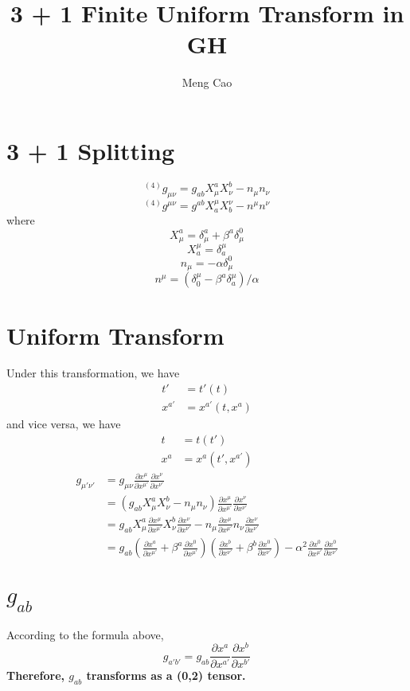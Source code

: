 \documentclass{article}
\begin{document}
\title{3 + 1 Finite Uniform Transform in GH}
\author{Meng Cao}
\maketitle
\section{3 + 1 Splitting}
\[
^{(4)}g_{\mu\nu} = g_{ab}X^{a}_{\mu}X^{b}_{\nu} - n_{\mu}n_{\nu}
\]
\[
^{(4)}g^{\mu\nu} = g^{ab}X^{\mu}_{a}X^{\nu}_{b} - n^{\mu}n^{\nu}
\]
where
\[
X^{a}_{\mu} = \delta^{a}_{\mu} + \beta^{a}\delta^{0}_{\mu} 
\]
\[
X^{\mu}_{a} = \delta^{\mu}_{a}
\]
\[
n_{\mu} = -\alpha \delta^{0}_{\mu}
\]
\[
n^{\mu} = (\delta^{\mu}_{0} - \beta^{a}\delta_{a}^{\mu})/\alpha
\]
\section{Uniform Transform}
Under this transformation, we have
\begin{align*}
t' &= t'(t)\\
x^{a'} &= x^{a'}(t,x^{a})
\end{align*}
and vice versa, we have
\begin{align*}
t & = t(t')\\
x^{a} & = x^{a}(t',x^{a'})
\end{align*}
\begin{align*}
g_{\mu'\nu'} & = g_{\mu\nu}\frac{\partial x^{\mu}}{\partial x^{\mu'}}\frac{\partial x^{\nu}}{\partial x^{\nu'}}\\
& = (g_{ab}X^{a}_{\mu}X^{b}_{\nu} - n_{\mu}n_{\nu})\frac{\partial x^{\mu}}{\partial x^{\mu'}}\frac{\partial x^{\nu}}{\partial x^{\nu'}}\\
& = g_{ab}X^{a}_{\mu}\frac{\partial x^{\mu}}{\partial x^{\mu'}}X^{b}_{\nu}\frac{\partial x^{\nu}}{\partial x^{\nu'}} - n_{\mu}\frac{\partial x^{\mu}}{\partial x^{\mu'}}n_{\nu}\frac{\partial x^{\nu}}{\partial x^{\nu'}}\\
& = g_{ab}(\frac{\partial x^{a}}{\partial x^{\mu '}} + \beta^{a}\frac{\partial x^{0}}{\partial x^{\mu '}})(\frac{\partial x^{b}}{\partial x^{\nu '}} + \beta^{b}\frac{\partial x^{0}}{\partial x^{\nu '}}) - \alpha^2\frac{\partial x^{0}}{\partial x^{\mu '}}\frac{\partial x^{0}}{\partial x^{\nu '}}
\end{align*}
\section{$g_{ab}$}
According to the formula above, 
\[
\boxed{
g_{a'b'} = g_{ab}\frac{\partial x^{a}}{\partial x^{a'}}\frac{\partial x^{b}}{\partial x^{b'}}
}
\]
{\bf {\color{red}Therefore, $g_{ab}$ transforms as a (0,2) tensor.}}
\end{document}
